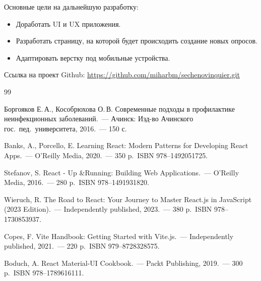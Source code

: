 \documentclass[a4paper,12pt]{article}
\begin{document}
    Основные цели на дальнейшую разработку:

    \begin{itemize}

        \item Доработать UI и UX приложения.

        \item Разработать страницу, на которой будет происходить создание новых опросов.

        \item Адаптировать верстку под мобильные устройства.

    \end{itemize}

    Ссылка на проект Github:
    \url{https://github.com/miharbm/sechenovinquier.git}


    \newpage
    \begin{thebibliography}{99}

         Боргояков Е.\,А., Кособрюхова О.\,В. Современные подходы в профилактике неинфекционных заболеваний.\ — Ачинск: Изд-во Ачинского гос.\ пед.\ университета, 2016.\ — 150 с.

         Banks, A., Porcello, E. Learning React: Modern Patterns for Developing React Apps.\ — O'Reilly Media, 2020.\ — 350 p.\ ISBN 978--1492051725.

         Stefanov, S. React - Up \&Running: Building Web Applications.\ — O'Reilly Media, 2016.\ — 280 p.\ ISBN 978--1491931820.

         Wieruch, R. The Road to React: Your Journey to Master React.js in JavaScript (2023 Edition).\ — Independently published, 2023.\ — 380 p.\ ISBN 978--1730853937.

         Copes, F. Vite Handbook: Getting Started with Vite.js.\ — Independently published, 2021.\ — 220 p.\ ISBN 979--8728328575.

         Boduch, A. React Material-UI Cookbook.\ — Packt Publishing, 2019.\ — 300 p.\ ISBN 978--1789616111.

    \end{thebibliography}
\end{document}

